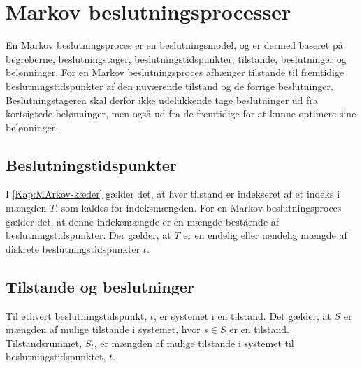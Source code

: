 \section{Markov beslutningsprocesser}
En Markov beslutningsproces er en beslutningsmodel, og er dermed baseret på begreberne, beslutningstager, beslutningstidspunkter, tilstande, beslutninger og belønninger. For en Markov beslutningsproces afhænger tilstande til fremtidige beslutningstidspunkter af den nuværende tilstand og de forrige beslutninger. Beslutningstageren skal derfor ikke udelukkende tage beslutninger ud fra kortsigtede belønninger, men også ud fra de fremtidige for at kunne optimere sine belønninger. 




\subsection{Beslutningstidspunkter}
I \autoref{Kap:MArkov-kæder} gælder det, at hver tilstand er indekseret af et indeks i mængden $T$, som kaldes for indeksmængden. For en Markov beslutningsproces gælder det, at denne indeksmængde er en mængde bestående af beslutningstidspunkter. Der gælder, at $T$ er en endelig eller uendelig mængde af diskrete beslutningstidspunkter $t$.%


\subsection{Tilstande og beslutninger}
Til ethvert beslutningstidspunkt, $t$, er systemet i en tilstand. Det gælder, at $S$ er mængden af mulige tilstande i systemet, hvor $s\in S$ er en tilstand. Tilstandsrummet, $S_t$, er mængden af mulige tilstande i systemet til beslutningstidspunktet, $t$. 

